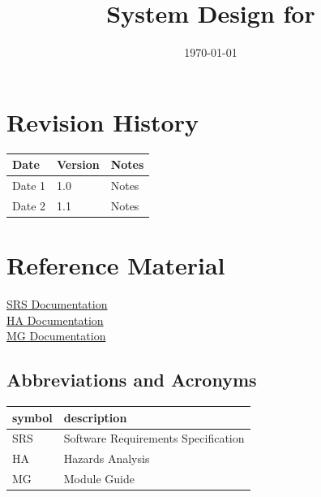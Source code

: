 \documentclass[12pt, titlepage]{article}
\begin{document}
\title{System Design for \progname{}} 
\author{\authname}
\date{\today}

\maketitle


\section{Revision History}

\begin{tabularx}{\textwidth}{p{3cm}p{2cm}X}
\toprule {\bf Date} & {\bf Version} & {\bf Notes}\\
\midrule
Date 1 & 1.0 & Notes\\
Date 2 & 1.1 & Notes\\
\bottomrule
\end{tabularx}

\newpage

\section{Reference Material}

\href{https://github.com/davimang/REACH/blob/main/docs/SRS/SRS.pdf}{SRS Documentation}\\
\href{https://github.com/davimang/REACH/blob/main/docs/HazardAnalysis/HazardAnalysis.pdf}{HA Documentation}\\
\href{https://github.com/davimang/REACH/blob/main/docs/Design/SoftArchitecture/MG.pdf}{MG Documentation}\\

\subsection{Abbreviations and Acronyms}

\renewcommand{\arraystretch}{1.2}
\begin{tabular}{l l} 
  \toprule		
  \textbf{symbol} & \textbf{description}\\
  \midrule 
  SRS & Software Requirements Specification\\
  HA & Hazards Analysis\\
  MG & Module Guide\\
  \bottomrule
\end{tabular}\\

\newpage
\end{document}
